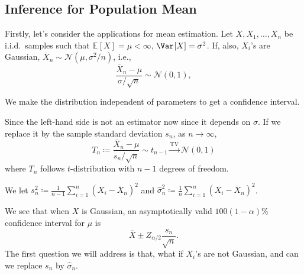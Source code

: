 \subsection{Inference for Population Mean}
Firstly, let's consider the applications for mean estimation. Let \(X, X_1, \dots , X_n\) be i.i.d.\ samples such that \(\mathbb{E}_{}[X] = \mu < \infty \), \(\Var_{}[X] = \sigma ^2\). If, also, \(X_i\)'s are Gaussian, \(\overline{X} _n \sim \mathcal{N} (\mu , \sigma ^2 / n)\), i.e.,
\[
	\frac{\overline{X} _n - \mu }{\sigma / \sqrt{n} } \sim \mathcal{N} (0, 1),
\]

\begin{intuition}
	We make the distribution independent of parameters to get a confidence interval.
\end{intuition}

Since the left-hand side is not an estimator now since it depends on \(\sigma \). If we replace it by the sample standard deviation \(s_n\), as \(n \to \infty \),
\[
	T_n \coloneqq \frac{\overline{X} _n - \mu }{s_n / \sqrt{n} } \sim t_{n-1} \overset{\operatorname{TV}}{\to } \mathcal{N} (0, 1)
\]
where \(T_n\) follows \(t\)-distribution with \(n-1\) degrees of freedom.

\begin{notation}
	We let \(s_n^2 \coloneqq \frac{1}{n-1} \sum_{i=1}^{n} (X_i - \overline{X} _n)^2\) and \(\hat{\sigma} _n^2 \coloneqq \frac{1}{n} \sum_{i=1}^{n} (X_i - \overline{X} _n)^2\).
\end{notation}

We see that when \(X\) is Gaussian, an asymptotically valid \(100 (1 - \alpha )\%\) confidence interval for \(\mu \) is
\[
	\overline{X} \pm Z_{\alpha / 2} \frac{s_n}{\sqrt{n} }.
\]
The first question we will address is that, what if \(X_i\)'s are not Gaussian, and can we replace \(s_n\) by \(\hat{\sigma} _n\).

